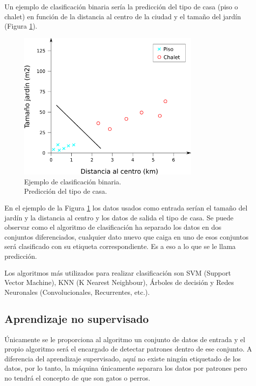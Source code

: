 \begin{itemize}
Un ejemplo de clasificación binaria sería la predicción del tipo de casa (piso o chalet) en función de la distancia al centro de la ciudad y el tamaño del jardín (Figura \ref{fig:ejemplo_clasificacion_binaria}).

\begin{figure} [h!]
  \begin{center}
    \includegraphics[width=9cm]{figs/ejemplo_clasificacion_binaria.png}
  \end{center}
  \caption{Ejemplo de clasificación binaria.\\
  Predicción del tipo de casa.}
  \label{fig:ejemplo_clasificacion_binaria}
\end{figure}

En el ejemplo de la Figura \ref{fig:ejemplo_clasificacion_binaria} los datos usados como entrada serían el tamaño del jardín y la distancia al centro y los datos de salida el tipo de casa. Se puede observar como el algoritmo de clasificación ha separado los datos en dos conjuntos diferenciados, cualquier dato nuevo que caiga en uno de esos conjuntos será clasificado con su etiqueta correspondiente. Es a eso a lo que se le llama predicción.

Los algoritmos más utilizados para realizar clasificación son SVM (Support Vector Machine), KNN (K Nearest Neighbour), Árboles de decisión y Redes Neuronales (Convolucionales, Recurrentes, etc.).

\end{itemize}

\subsection{Aprendizaje no supervisado}

Únicamente se le proporciona al algoritmo un conjunto de datos de entrada y el propio algoritmo será el encargado de detectar patrones dentro de ese conjunto. A diferencia del aprendizaje supervisado, aquí no existe ningún etiquetado de los datos, por lo tanto, la máquina únicamente separara los datos por patrones pero no tendrá el concepto de que son gatos o perros.\\

